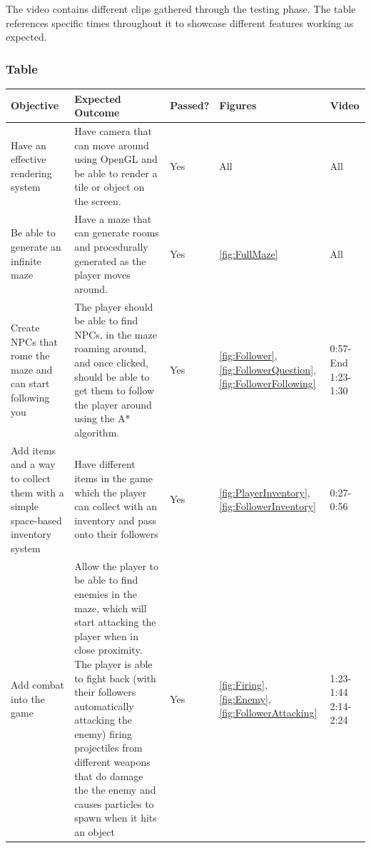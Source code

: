 \documentclass[../Main.tex]{subfiles}
\begin{document}
            The video contains different clips gathered through the testing phase. The table references specific times throughout it to showcase different features working as expected.
        \clearpage
        \subsubsection{Table}
            \begin{center}
                \begin{tabular}{ | m{} | m{} | m{} | m{} | m{}| }
                    \hline
                    \textbf{Objective} & \textbf{Expected Outcome} & \textbf{Passed?} & \textbf{Figures} & \textbf{Video} \\
                    \hline
                    Have an effective rendering system & Have camera that can move around using OpenGL and be able to render a tile or object on the screen. & Yes & All & All \\
                    \hline
                    Be able to generate an infinite maze & Have a maze that can generate rooms and procedurally generated as the player moves around. & Yes & \ref{fig:FullMaze} & All \\
                    \hline
                    Create NPCs that rome the maze and can start following you & The player should be able to find NPCs, in the maze roaming around, and once clicked, should be able to get them to follow the player around using the A* algorithm. & Yes & \ref{fig:Follower}, \ref{fig:FollowerQuestion}, \ref{fig:FollowerFollowing} & 0:57-End 1:23-1:30 \\
                    \hline
                    Add items and a way to collect them with a simple space-based inventory system & Have different items in the game which the player can collect with an inventory and pass onto their followers & Yes & \ref{fig:PlayerInventory}, \ref{fig:FollowerInventory} & 0:27-0:56 \\
                    \hline
                    Add combat into the game & Allow the player to be able to find enemies in the maze, which will start attacking the player when in close proximity. The player is able to fight back (with their followers automatically attacking the enemy) firing projectiles from different weapons that do damage the the enemy and causes particles to spawn when it hits an object & Yes & \ref{fig:Firing}, \ref{fig:Enemy}, \ref{fig:FollowerAttacking} & 1:23-1:44 2:14-2:24 \\

\end{tabular}
\end{center}
\end{document}
